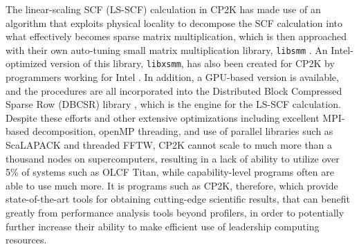 The linear-scaling SCF (LS-SCF) calculation \cite{vandevondele2012linear} in CP2K has made use of an algorithm that exploits physical locality to decompose the SCF calculation into what effectively becomes sparse matrix multiplication, which is then approached with their own auto-tuning small matrix multiplication library, \texttt{libsmm} \cite{borvstnik2014sparse}. An Intel-optimized version of this library, \texttt{libxsmm}, has also been created for CP2K by programmers working for Intel \cite{heinecke2016libxsmm}. In addition, a GPU-based version is available, and the procedures are all incorporated into the Distributed Block Compressed Sparse Row (DBCSR) library \cite{borvstnik2014sparse,schutt2016gpu}, which is the engine for the LS-SCF calculation. Despite these efforts and other extensive optimizations including excellent MPI-based decomposition, openMP threading, and use of parallel libraries such as ScaLAPACK and threaded FFTW, CP2K cannot scale to much more than a thousand nodes on supercomputers, resulting in a lack of ability to utilize over 5\% of systems such as OLCF Titan, while capability-level programs often are able to use much more. It is programs such as CP2K, therefore, which provide state-of-the-art tools for obtaining cutting-edge scientific results, that can benefit greatly from performance analysis tools beyond profilers, in order to potentially further increase their ability to make efficient use of leadership computing resources.
